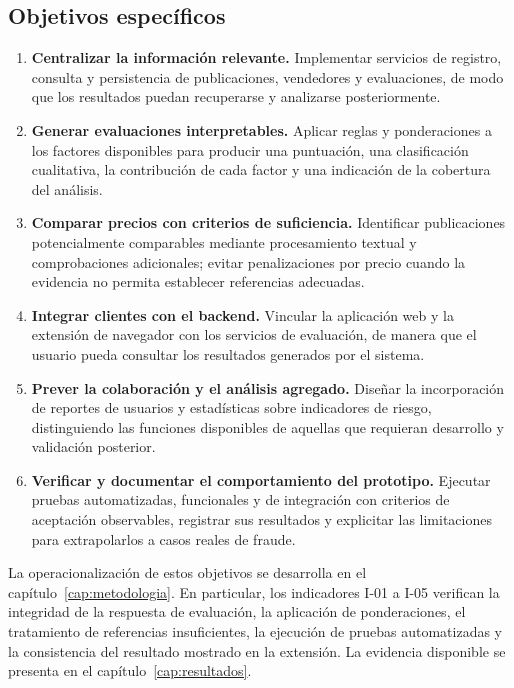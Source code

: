 \subsection{Objetivos específicos}\label{subsec:ml-objetivos-especificos}

\begin{enumerate}
    \item \textbf{Centralizar la información relevante.} Implementar servicios de registro, consulta y persistencia de publicaciones, vendedores y evaluaciones, de modo que los resultados puedan recuperarse y analizarse posteriormente.

    \item \textbf{Generar evaluaciones interpretables.} Aplicar reglas y ponderaciones a los factores disponibles para producir una puntuación, una clasificación cualitativa, la contribución de cada factor y una indicación de la cobertura del análisis.

    \item \textbf{Comparar precios con criterios de suficiencia.} Identificar publicaciones potencialmente comparables mediante procesamiento textual y comprobaciones adicionales; evitar penalizaciones por precio cuando la evidencia no permita establecer referencias adecuadas.

    \item \textbf{Integrar clientes con el backend.} Vincular la aplicación web y la extensión de navegador con los servicios de evaluación, de manera que el usuario pueda consultar los resultados generados por el sistema.

    \item \textbf{Prever la colaboración y el análisis agregado.} Diseñar la incorporación de reportes de usuarios y estadísticas sobre indicadores de riesgo, distinguiendo las funciones disponibles de aquellas que requieran desarrollo y validación posterior.

    \item \textbf{Verificar y documentar el comportamiento del prototipo.} Ejecutar pruebas automatizadas, funcionales y de integración con criterios de aceptación observables, registrar sus resultados y explicitar las limitaciones para extrapolarlos a casos reales de fraude.
\end{enumerate}

La operacionalización de estos objetivos se desarrolla en el capítulo~\ref{cap:metodologia}. En particular, los indicadores I-01 a I-05 verifican la integridad de la respuesta de evaluación, la aplicación de ponderaciones, el tratamiento de referencias insuficientes, la ejecución de pruebas automatizadas y la consistencia del resultado mostrado en la extensión. La evidencia disponible se presenta en el capítulo~\ref{cap:resultados}.

